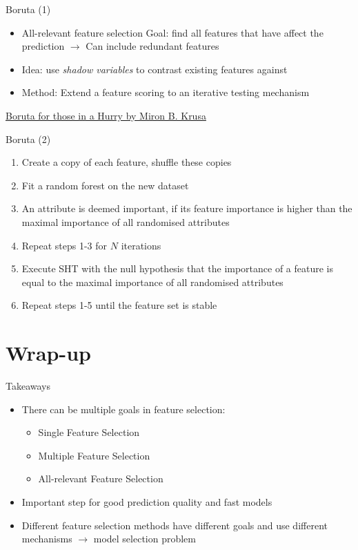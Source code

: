 \documentclass[11pt,compress,t,notes=noshow, xcolor=table]{beamer}
\begin{document}
\begin{frame}{Boruta (1)}
    \begin{itemize}
        \item All-relevant feature selection
        \newline Goal: find all features that have affect the prediction
        \newline $\rightarrow$ Can include redundant features
        \item Idea: use \emph{shadow variables} to contrast existing features against
        \item Method: Extend a feature scoring to an iterative testing mechanism
    \end{itemize}
    \vfill
    \href{https://cran.r-project.org/web/packages/Boruta/vignettes/inahurry.pdf}{Boruta for those in a Hurry by Miron B. Krusa}
\end{frame}

\begin{frame}{Boruta (2)}
    \vfill
    \begin{enumerate}
        \item Create a copy of each feature, shuffle these copies
        \item Fit a random forest on the new dataset
        \item An attribute is deemed important, if its feature importance is higher than the maximal importance of all randomised attributes
        \item Repeat steps 1-3 for $N$ iterations
        \item Execute SHT with the null hypothesis that the importance of a feature is equal to the maximal importance of all randomised attributes
        \item Repeat steps 1-5 until the feature set is stable
    \end{enumerate}
    \vfill
\end{frame}

\section{Wrap-up}

\begin{frame}{Takeaways}
    \vfill
    \begin{itemize}
        \item There can be multiple goals in feature selection:
        \begin{itemize}
            \item Single Feature Selection
            \item Multiple Feature Selection
            \item All-relevant Feature Selection
        \end{itemize}
        \item Important step for good prediction quality and fast models
        \item Different feature selection methods have different goals and use different mechanisms $\rightarrow$ model selection problem
    \end{itemize}
    \vfill
\end{frame}

\endlecture
\end{document}

